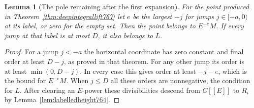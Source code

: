 \documentclass[a4paper,11pt]{article}
\newtheorem{lemma}[proposition]{Lemma}
\theoremstyle{definition}
\theoremstyle{remark}
\numberwithin{equation}{section}
\begin{document}
\begin{lemma}[The pole remaining after the first expansion]
\leavevmode\label{lem:remainingpole772}
For the point produced in Theorem~\ref{thm:deepintegrallift767}
let \(e\) be the largest \(-j\) for jumps \(j\in[-a,0)\)
at its label, or zero for the empty set. Then the point
belongs to \(E^{-e}M\). If every jump at that label is at
most \(D\), it also belongs to \(L\).
\end{lemma}
\begin{proof}
For a jump \(j<-a\) the horizontal coordinate has zero
constant and final order at least \(D-j\), as proved in
that theorem. For any other jump its order is at least
\(\min(0,D-j)\). In every case this gives order at least
\(-j-e\), which is the bound for \(E^{-e}M\). When \(j\le D\)
all these orders are nonnegative, the condition for \(L\).
After clearing an \(E\)-power these divisibilities descend
from \(C[[E]]\) to \(R_i\) by Lemma~\ref{lem:labelledheight764}.
\end{proof}
\end{document}
